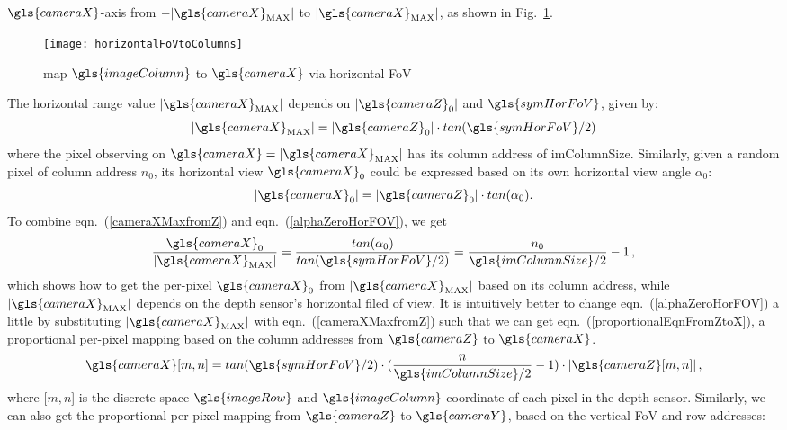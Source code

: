 \(\gls{cameraX}\)-axis from \(-|\gls{cameraX}_{\text{MAX}}|\) to \(|\gls{cameraX}_{\text{MAX}}|\), as shown in Fig.~\ref{horizontalFoVtoColumns}. %
\begin{figure}[!t]
\centering
\texttt{[image: horizontalFoVtoColumns]}
\caption{map \(\gls{imageColumn}\) to \(\gls{cameraX}\) via horizontal \gls{FoV}}
\label{horizontalFoVtoColumns}
\end{figure}%
%
The horizontal range value \(|\gls{cameraX}_{\text{MAX}}|\) depends on \(|\gls{cameraZ}_0|\) and \(\gls{symHorFoV}\), given by:
%
\begin{equation}
|\gls{cameraX}_{\text{MAX}}| = |\gls{cameraZ}_0| \cdot tan(\gls{symHorFoV} / 2) 
\label{cameraXMaxfromZ}
\end{equation}%
\noindent
where the pixel observing on \(\gls{cameraX} = |\gls{cameraX}_{\text{MAX}}|\) has its column address of \gls{imColumnSize}. Similarly, given a random pixel of column address \(n_0\), its horizontal view \(\gls{cameraX}_0\) could be expressed based on its own horizontal view angle \(\alpha_0\):
%
\begin{equation}
|\gls{cameraX}_{0}| = |\gls{cameraZ}_0| \cdot tan(\alpha_0)  .
\label{alphaZeroHorFOV}
\end{equation}%
\noindent
To combine eqn.~(\ref{cameraXMaxfromZ}) and eqn.~(\ref{alphaZeroHorFOV}), we get
%
\begin{equation}
\frac{\gls{cameraX}_0}{|\gls{cameraX}_{\text{MAX}}|} = \frac{tan(\alpha_0)}{tan(\gls{symHorFoV} / 2)} = \frac{n_0}{\gls{imColumnSize}/2} - 1\, ,
\label{alphaZeroHorFOV}
\end{equation}%
\noindent
which shows how to get the per-pixel \(\gls{cameraX}_0\) from \(|\gls{cameraX}_{\text{MAX}}|\) based on its column address, while \(|\gls{cameraX}_{\text{MAX}}|\) depends on the depth sensor's horizontal filed of view. It is intuitively better to change eqn.~(\ref{alphaZeroHorFOV}) a little by substituting \(|\gls{cameraX}_{\text{MAX}}|\) with eqn.~(\ref{cameraXMaxfromZ}) such that we can get eqn.~(\ref{proportionalEqnFromZtoX}), a proportional per-pixel mapping based on the column addresses from \(\gls{cameraZ}\) to \(\gls{cameraX}\).
%
\begin{equation}
\gls{cameraX} [m, n] = tan(\gls{symHorFoV} / 2) \cdot (\frac{n}{\gls{imColumnSize}/2} - 1) \cdot |\gls{cameraZ} [m, n]|\, ,
\label{proportionalEqnFromZtoX}
\end{equation}%
\noindent
where [\(m,n\)] is the discrete space \(\gls{imageRow}\) and \(\gls{imageColumn}\) coordinate of each pixel in the depth sensor. Similarly, we can also get the proportional per-pixel mapping from \(\gls{cameraZ}\) to \(\gls{cameraY}\), based on the vertical \gls{FoV} and row addresses:
